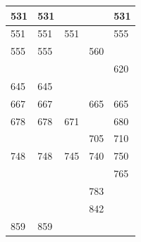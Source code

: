 \begin{table}
\begin{tabular}{|l|l|l|l|l|}
        531                         & 531                         &                             &                             & 531                         \\ \hline
        551                         & 551                         & 551                         &                             & 555                         \\ \hline
        555                         & 555                         &                             & 560                         &                             \\ \hline
                                    &                             &                             &                             & 620                         \\ \hline
        645                         & 645                         &                             &                             &                             \\ \hline
        667                         & 667                         &                             & 665                         & 665                         \\ \hline
        678                         & 678                         & 671                         &                             & 680                         \\ \hline
                                    &                             &                             & {\color[HTML]{FE0000} 705}  & {\color[HTML]{FE0000} 710}  \\ \hline
        748                         & 748                         & 745                         & 740                         & 750                         \\ \hline
                                    &                             &                             &                             & 765                         \\ \hline
                                    &                             &                             & 783                         &                             \\ \hline
                                    &                             &                             & 842                         &                             \\ \hline
        859                         & 859                         &                             &                             &                             \\ \hline

\end{tabular}
\end{table}
